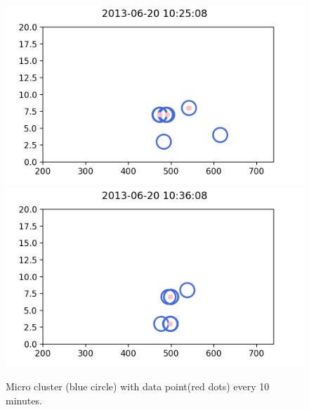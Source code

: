 \begin{figure}
        \includegraphics[width = 5 cm]{image/Chapters/Chapter6/value327.png}\hfill
        \includegraphics[width = 5 cm]{image/Chapters/Chapter6/value343.png}\hfill
    \caption{Micro cluster (blue circle) with data point(red dots) every 10 minutes.}
    \label{drift}
\end{figure}





